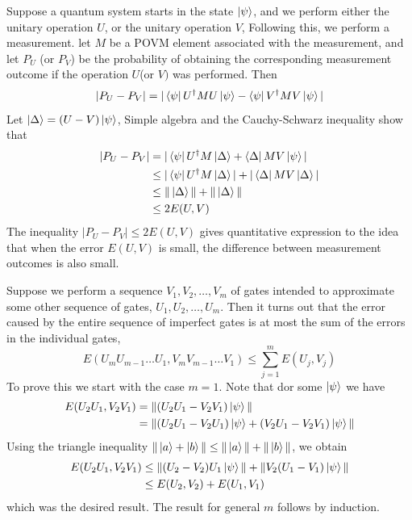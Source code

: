 \begin{importantnote}
    Suppose a quantum system starts in the state $\ket{\psi}$, and we perform either the unitary operation $U$, or the unitary operation $V$, Following this, we perform a measurement. let $M$ be a POVM element associated with the measurement, and let $P_U$ (or $P_V$) be the probability of obtaining the corresponding measurement outcome if the operation $U$(or $V)$ was performed. Then
    \[
    |P_U-P_V|=|\bra{\psi}U^{\dagger}MU\ket{\psi} - \bra{\psi}V^{\dagger}MV\ket{\psi}|
    \]
    Let $\ket{\Delta}=(U-V)\ket{\psi}$, Simple algebra and the Cauchy-Schwarz inequality show that
    \begin{align*}
        |P_U-P_V| &=|\bra{\psi}U^{\dagger}M\ket{\Delta} + \bra{\Delta}MV\ket{\psi}|\\
        &\leq |\bra{\psi}U^{\dagger}M\ket{\Delta}| + |\bra{\Delta}MV\ket{\Delta}|\\
        &\leq \|\ket{\Delta}\| + \|\ket{\Delta}\|\\
        &\leq 2E(U,V)
    \end{align*}
    The inequality $|P_U-P_V|\leq 2E(U,V)$ gives quantitative expression to the idea that when the error $E(U,V)$ is small, the difference between measurement outcomes is also small.

    Suppose we perform a sequence $V_1,V_2,\ldots,V_m$ of gates intended to approximate some other sequence of gates, $U_1,U_2,\ldots,U_m$. Then it turns out that the error caused by the entire sequence of imperfect gates is at most the sum of the errors in the individual gates,
    \[
    E(U_mU_{m-1}\ldots U_1,V_m V_{m-1}\ldots V_1)\leq \sum_{j=1}^m E(U_j,V_j)
    \]
    To prove this we start with the case $m=1$. Note that dor some $\ket{\psi}$ we have
    \begin{align*}
    E(U_2U_1,V_2V_1)&=\|(U_2U_1-V_2V_1)\ket{\psi}\|\\
    &=\|(U_2U_1-V_2U_1)\ket{\psi}+(V_2U_1-V_2V_1)\ket{\psi}\|
    \end{align*}
    Using the triangle inequality $\|\ket{a}+\ket{b}\|\leq \|\ket{a}\| + \|\ket{b}\|$, we obtain
    \begin{align*}
        E(U_2U_1,V_2V_1) &\leq \|(U_2-V_2)U_1\ket{\psi}\| + \|V_2(U_1-V_1)\ket{\psi}\|\\
        &\leq E(U_2,V_2) + E(U_1,V_1)
    \end{align*}
    which was the desired result. The result for general $m$ follows by induction.
\end{importantnote}

